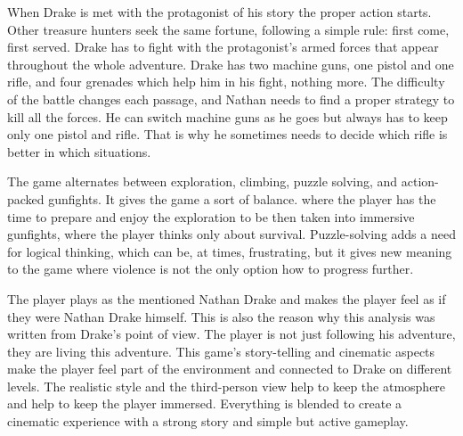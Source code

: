 \documentclass[a4paper,10pt,english]{article}
\begin{document}
When Drake is met with the protagonist of his story the proper action starts. Other treasure hunters seek the same fortune, following a simple rule: first come, first served. Drake has to fight with the protagonist's armed forces that appear throughout the whole adventure. Drake has two machine guns, one pistol and one rifle, and four grenades which help him in his fight, nothing more. The difficulty of the battle changes each passage, and Nathan needs to find a proper strategy to kill all the forces. He can switch machine guns as he goes but always has to keep only one pistol and rifle. That is why he sometimes needs to decide which rifle is better in which situations.

The game alternates between exploration, climbing, puzzle solving, and action-packed gunfights. It gives the game a sort of balance. where the player has the time to prepare and enjoy the exploration to be then taken into immersive gunfights, where the player thinks only about survival. Puzzle-solving adds a need for logical thinking, which can be, at times, frustrating, but it gives new meaning to the game where violence is not the only option how to progress further. 

The player plays as the mentioned Nathan Drake and makes the player feel as if they were Nathan Drake himself. This is also the reason why this analysis was written from Drake's point of view. The player is not just following his adventure, they are living this adventure. This game's story-telling and cinematic aspects make the player feel part of the environment and connected to Drake on different levels. The realistic style and the third-person view help to keep the atmosphere and help to keep the player immersed. Everything is blended to create a cinematic experience with a strong story and simple but active gameplay.
\end{document}
